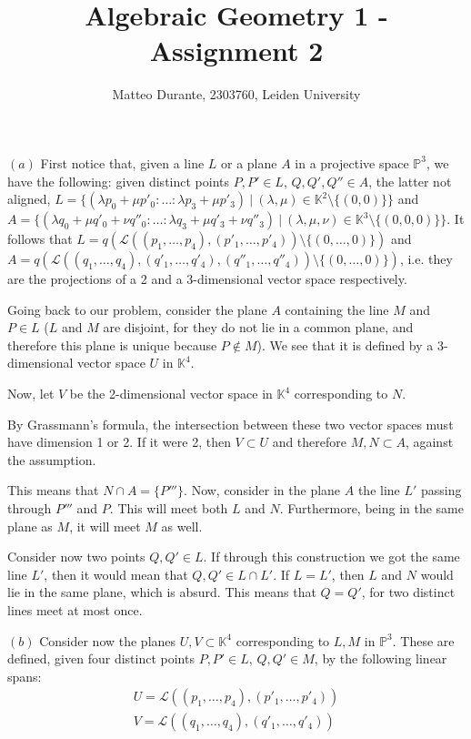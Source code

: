 \documentclass{article}
\newcommand{\numberset}{\mathbb}
\newcommand{\K}{\numberset{K}}
\newcommand{\Ps}{\mathbb{P}}
\newcommand{\exercise}[1]{\noindent {\bf Exercise #1}}
\begin{document}
\title{Algebraic Geometry 1 - Assignment 2}

\author{Matteo Durante, 2303760, Leiden University}

\maketitle


\exercise{1}

$(a)$ First notice that, given a line $L$ or a plane $A$ in a projective space $\Ps^3$, we have the following: given distinct points $P,P'\in L$, $Q,Q',Q''\in A$, the latter not aligned, $L=\{(\lambda p_0+\mu p'_0:\ldots:\lambda p_3+\mu p'_3)\ |\ (\lambda,\mu)\in\K^2\setminus\{(0,0)\}\}$ and $A=\{(\lambda q_0+\mu q'_0+\nu q''_0:\ldots:\lambda q_3+\mu q'_3+\nu q''_3)\ |\ (\lambda,\mu,\nu)\in\K^3\setminus\{(0,0,0)\}\}$. It follows that $L=q(\mathcal{L}((p_1,\ldots,p_4),(p'_1,\ldots,p'_4))\setminus\{(0,\ldots,0)\})$ and $A=q(\mathcal{L}((q_1,\ldots,q_4),(q'_1,\ldots,q'_4),(q''_1,\ldots,q''_4))\setminus\{(0,\ldots,0)\})$, i.e. they are the projections of a 2 and a 3-dimensional vector space respectively.

Going back to our problem, consider the plane $A$ containing the line $M$ and $P\in L$ ($L$ and $M$ are disjoint, for they do not lie in a common plane, and therefore this plane is unique because $P\not\in M$). We see that it is defined by a 3-dimensional vector space $U$ in $\K^4$.

Now, let $V$ be the 2-dimensional vector space in $\K^4$ corresponding to $N$.

By Grassmann's formula, the intersection between these two vector spaces must have dimension 1 or 2. If it were 2, then $V\subset U$ and therefore $M,N\subset A$, against the assumption.

This means that $N\cap A=\{P'''\}$. Now, consider in the plane $A$ the line $L'$ passing through $P'''$ and $P$. This will meet both $L$ and $N$. Furthermore, being in the same plane as $M$, it will meet $M$ as well.

Consider now two points $Q,Q'\in L$. If through this construction we got the same line $L'$, then it would mean that $Q,Q'\in L\cap L'$. If $L=L'$, then $L$ and $N$ would lie in the same plane, which is absurd. This means that $Q=Q'$, for two distinct lines meet at most once.

$(b)$ Consider now the planes $U,V\subset\K^4$ corresponding to $L,M$ in $\Ps^3$. These are defined, given four distinct points $P,P'\in L$, $Q,Q'\in M$, by the following linear spans:
\begin{align*}
		U=\mathcal{L}((p_1,\ldots,p_4),(p'_1,\ldots,p'_4)) \\
		V=\mathcal{L}((q_1,\ldots,q_4),(q'_1,\ldots,q'_4))
\end{align*}
\end{document}
